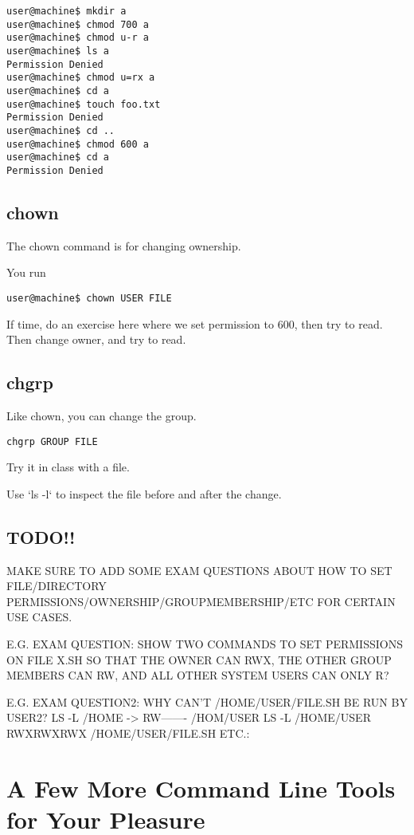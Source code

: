 \documentclass[10pt]{article}
\begin{document}
\begin{lstlisting}[style=term]
user@machine$ mkdir a
user@machine$ chmod 700 a
user@machine$ chmod u-r a
user@machine$ ls a
Permission Denied
user@machine$ chmod u=rx a
user@machine$ cd a
user@machine$ touch foo.txt
Permission Denied
user@machine$ cd ..
user@machine$ chmod 600 a
user@machine$ cd a
Permission Denied
\end{lstlisting}

\subsection{ chown }
The chown command is for changing ownership.

You run 

\begin{lstlisting}[style=term]
user@machine$ chown USER FILE
\end{lstlisting}

If time, do an exercise here where we set permission to 600, then try to read.
Then change owner, and try to read. 

\subsection{ chgrp }

Like chown, you can change the group.

\begin{lstlisting}[style=term]
chgrp GROUP FILE
\end{lstlisting}

Try it in class with a file. 

Use `ls -l` to inspect the file before and after the change.

\subsection{ TODO!! }
MAKE SURE TO ADD SOME EXAM QUESTIONS ABOUT HOW TO SET FILE/DIRECTORY PERMISSIONS/OWNERSHIP/GROUPMEMBERSHIP/ETC FOR CERTAIN USE CASES.

E.G. EXAM QUESTION:
SHOW TWO COMMANDS TO SET PERMISSIONS ON FILE X.SH SO THAT THE OWNER CAN RWX, THE OTHER GROUP MEMBERS CAN RW, AND ALL OTHER SYSTEM USERS CAN ONLY R?

E.G. EXAM QUESTION2:
WHY CAN'T /HOME/USER/FILE.SH BE RUN BY USER2? 
LS -L /HOME -> RW------- /HOM/USER
LS -L /HOME/USER RWXRWXRWX /HOME/USER/FILE.SH
ETC.:


\section{ A Few More Command Line Tools for Your Pleasure }
\end{document}
